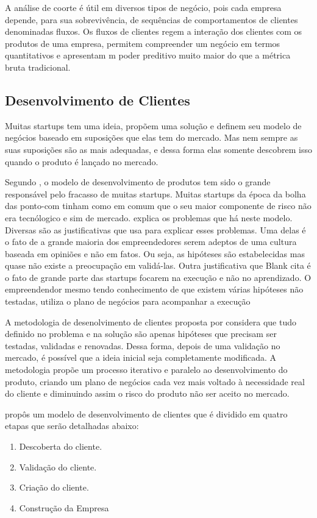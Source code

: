 A análise de coorte é útil em diversos tipos de negócio, pois cada empresa depende, para sua sobrevivência, de sequências de comportamentos de clientes denominadas fluxos. Os fluxos de clientes regem a interação dos clientes com os produtos de uma empresa, permitem compreender um negócio em termos quantitativos e apresentam m poder preditivo muito maior do que a métrica bruta tradicional. \cite{leanstartup}

\subsection{Desenvolvimento de Clientes}
\label{cha:desenvolvimento_de_clientes}
Muitas startups tem uma ideia, propõem uma solução e definem seu modelo de negócios baseado em suposições que elas tem do mercado. Mas nem sempre as suas suposições são as mais adequadas, e dessa forma elas somente descobrem isso quando o produto é lançado no mercado.

Segundo , o modelo de desenvolvimento de produtos tem sido o grande responsável pelo fracasso de muitas startups. Muitas startups da época da bolha das ponto-com tinham como  em comum que o seu maior componente de risco não era tecnólogico e sim de mercado.  explica os problemas que há neste modelo. Diversas são as justificativas que  usa para explicar esses problemas. Uma delas é o fato de a grande maioria dos empreendedores serem adeptos de uma cultura baseada em opiniões e não em fatos. Ou seja, as hipóteses são estabelecidas mas quase não existe a preocupação em validá-las. Outra justificativa que Blank cita é o fato de grande parte das startups focarem na execução e não no aprendizado. O empreendendor mesmo tendo conhecimento de que existem várias hipóteses não testadas, utiliza o plano de negócios para acompanhar a execução

A metodologia de desenolvimento de clientes proposta por  considera que tudo definido no problema e na solução são apenas hipóteses que precisam ser testadas, validadas e renovadas. Dessa forma, depois de uma validação no mercado, é possível que a ideia inicial seja completamente modificada. A metodologia propõe um processo iterativo e paralelo ao desenvolvimento do produto, criando um plano de negócios cada vez mais voltado à necessidade real do cliente e diminuindo assim o risco do produto não ser aceito no mercado.

 propôs um modelo de desenvolvimento de clientes que é dividido em quatro etapas que serão detalhadas abaixo:
\begin{enumerate}
\item Descoberta do cliente.
\item Validação do cliente.
\item Criação do cliente.
\item Construção da Empresa
\end{enumerate}


